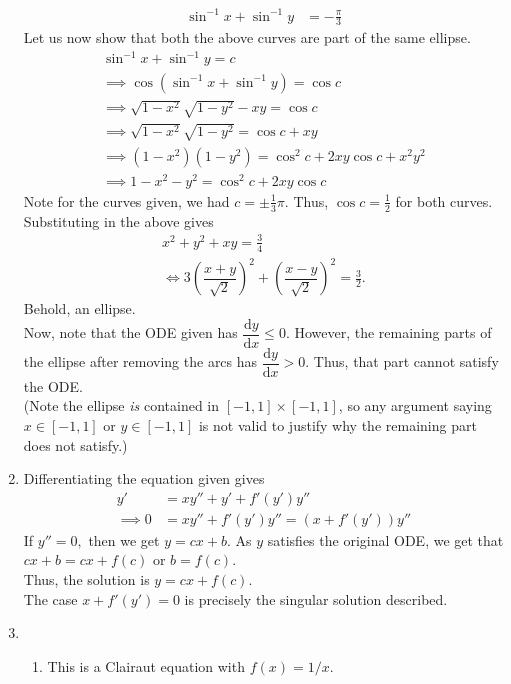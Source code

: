 \documentclass[12pt]{article}
\theoremstyle{definition}
\numberwithin{thm}{section}
\newcommand{\dd}{{\mathrm d}}
\begin{document}
\begin{enumerate}[leftmargin=*, label = Q.\arabic*.]
\begin{align*}
		\sin^{-1}x + \sin^{-1}y &= -\frac{\pi}{3}
	\end{align*}
	Let us now show that both the above curves are part of the same ellipse.
	\begin{align*} 
		\sin^{-1}x + \sin^{-1}y = c\\
		\implies \cos\left(\sin^{-1}x + \sin^{-1}y\right) = \cos c\\
		\implies \sqrt{1 - x^2}\sqrt{1 - y^2} - xy = \cos c\\
		\implies \sqrt{1 - x^2}\sqrt{1 - y^2} = \cos c + xy\\
		\implies (1 - x^2)(1 - y^2) = \cos^2c + 2xy\cos c + x^2y^2\\
		\implies 1 - x^2 - y^2 = \cos^2c + 2xy\cos c
	\end{align*}
	Note for the curves given, we had $c = \pm \frac{1}{3}\pi.$ Thus, $\cos c = \frac{1}{2}$ for both curves. Substituting in the above gives
	\begin{align*} 
		x^2 + y^2 + xy = \frac{3}{4}\\
		\iff 3\left(\dfrac{x + y}{\sqrt{2}}\right)^2 + \left(\dfrac{x - y}{\sqrt{2}}\right)^2 = \frac{3}{2}.
	\end{align*}
	Behold, an ellipse.\\
	Now, note that the ODE given has $\dfrac{\dd y}{\dd x} \le 0.$ However, the remaining parts of the ellipse after removing the arcs has $\dfrac{\dd y}{\dd x} > 0.$ Thus, that part cannot satisfy the ODE.\\
	(Note the ellipse \emph{is} contained in $[-1, 1] \times [-1, 1]$, so any argument saying $x \in [-1, 1]$ or $y \in [-1, 1]$ is not valid to justify why the remaining part does not satisfy.)
	\item Differentiating the equation given gives
	\begin{align*} 
		y' &= xy'' + y' + f'(y')y''\\
		\implies 0 &= xy'' + f'(y')y'' = (x + f'(y'))y''
	\end{align*}
	If $y'' = 0,$ then we get $y = cx + b.$ As $y$ satisfies the original ODE, we get that $cx + b = cx + f(c)$ or $b = f(c).$\\
	Thus, the solution is $y = cx + f(c).$\\
	The case $x + f'(y') = 0$ is precisely the singular solution described.
	\item 
	\begin{enumerate}[label = (\roman*)] 
		\item This is a Clairaut equation with $f(x) = 1/x.$\\

\end{enumerate}
\end{enumerate}
\end{document}
